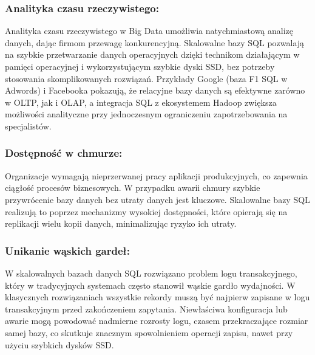 \documentclass[a4paper,11pt,openany,english]{sphinxmanual}
\begin{document}
\subsubsection{Analityka czasu rzeczywistego:}
\label{\detokenize{rozdzial2/Wydajnosc-Skalowanie-i-Replikacja/index:analityka-czasu-rzeczywistego}}
\sphinxAtStartPar
Analityka czasu rzeczywistego w Big Data umożliwia natychmiastową analizę danych, dając firmom przewagę konkurencyjną. Skalowalne bazy SQL pozwalają na szybkie przetwarzanie danych operacyjnych dzięki technikom działającym w pamięci operacyjnej i wykorzystującym szybkie dyski SSD, bez potrzeby stosowania skomplikowanych rozwiązań. Przykłady Google (baza F1 SQL w Adwords) i Facebooka pokazują, że relacyjne bazy danych są efektywne zarówno w OLTP, jak i OLAP, a integracja SQL z ekosystemem Hadoop zwiększa możliwości analityczne przy jednoczesnym ograniczeniu zapotrzebowania na specjalistów.


\subsubsection{Dostępność w chmurze:}
\label{\detokenize{rozdzial2/Wydajnosc-Skalowanie-i-Replikacja/index:dostepnosc-w-chmurze}}
\sphinxAtStartPar
Organizacje wymagają nieprzerwanej pracy aplikacji produkcyjnych, co zapewnia ciągłość procesów biznesowych. W przypadku awarii chmury szybkie przywrócenie bazy danych bez utraty danych jest kluczowe. Skalowalne bazy SQL realizują to poprzez mechanizmy wysokiej dostępności, które opierają się na replikacji wielu kopii danych, minimalizując ryzyko ich utraty.


\subsubsection{Unikanie wąskich gardeł:}
\label{\detokenize{rozdzial2/Wydajnosc-Skalowanie-i-Replikacja/index:unikanie-waskich-gardel}}
\sphinxAtStartPar
W skalowalnych bazach danych SQL rozwiązano problem logu transakcyjnego, który w tradycyjnych systemach często stanowił wąskie gardło wydajności. W klasycznych rozwiązaniach wszystkie rekordy muszą być najpierw zapisane w logu transakcyjnym przed zakończeniem zapytania. Niewłaściwa konfiguracja lub awarie mogą powodować nadmierne rozrosty logu, czasem przekraczające rozmiar samej bazy, co skutkuje znacznym spowolnieniem operacji zapisu, nawet przy użyciu szybkich dysków SSD.
\end{document}

